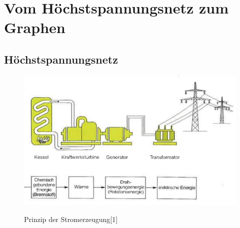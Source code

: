 
\chapter{Vom Höchstspannungsnetz zum Graphen}
\label{Kapitel 2}
%

\section{Höchstspannungsnetz}
\label{Höchstspannungsnetz}
%
\begin{figure}[t]
	\centering
	{\includegraphics[scale=0.9]{bilder/pds}\label{fig_pds}
	}\\
	\caption[Prinzip der Stromerzeugung]{Prinzip der Stromerzeugung[1]}
	\label{fig_pds}
\end{figure}
